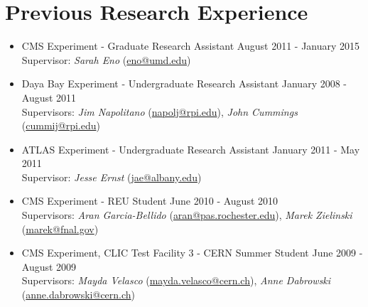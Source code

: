 \section{Previous Research Experience}
\begin{itemize}[leftmargin=12pt]
\item CMS Experiment - Graduate Research Assistant \hfill August 2011 - January 2015 \\
Supervisor: {\sl Sarah Eno} (\href{mailto:eno@umd.edu}{eno@umd.edu})
\item Daya Bay Experiment - Undergraduate Research Assistant \hfill January 2008 - August 2011 \\
Supervisors: {\sl Jim Napolitano} (\href{mailto:napolj@rpi.edu}{napolj@rpi.edu}), {\sl John Cummings} (\href{mailto:cummij@rpi.edu}{cummij@rpi.edu})
\item ATLAS Experiment - Undergraduate Research Assistant \hfill January 2011 - May 2011 \\
Supervisor: {\sl Jesse Ernst} (\href{mailto:jae@albany.edu}{jae@albany.edu})
\item CMS Experiment - REU Student \hfill June 2010 - August 2010 \\
Supervisors: {\sl Aran Garcia-Bellido} (\href{mailto:aran@pas.rochester.edu}{aran@pas.rochester.edu}), {\sl Marek Zielinski} (\href{mailto:marek@fnal.gov}{marek@fnal.gov})
\item CMS Experiment, CLIC Test Facility 3 - CERN Summer Student \hfill June 2009 - August 2009 \\
Supervisors: {\sl Mayda Velasco} (\href{mailto:mayda.velasco@cern.ch}{mayda.velasco@cern.ch}), {\sl Anne Dabrowski} (\href{mailto:anne.dabrowski@cern.ch}{anne.dabrowski@cern.ch})
\end{itemize}
